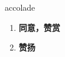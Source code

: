 
\begin{frame}
{\huge accolade}
\begin{center}
\begin{enumerate}\Large
  \item \textbf{同意，赞赏}
  \item \textbf{赞扬}
\end{enumerate}
\end{center}
\end{frame}
